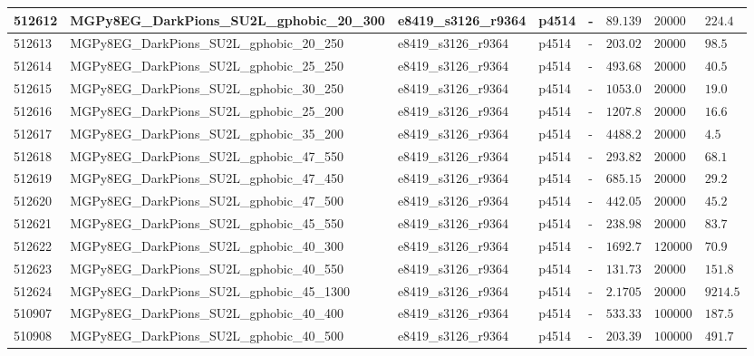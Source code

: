 \begin{table}[!hbtp]
{\begin{tabular}{llllllll}
    \hline
    512612 & MGPy8EG\_DarkPions\_SU2L\_gphobic\_20\_300 & e8419\_s3126\_r9364 & p4514 & - & $89.139$ & $20000$ & $224.4$\\
    \hline
    512613 & MGPy8EG\_DarkPions\_SU2L\_gphobic\_20\_250 & e8419\_s3126\_r9364 & p4514 & - & $203.02$ & $20000$ & $98.5$\\
    \hline
    512614 & MGPy8EG\_DarkPions\_SU2L\_gphobic\_25\_250 & e8419\_s3126\_r9364 & p4514 & - & $493.68$ & $20000$ & $40.5$\\
    \hline
    512615 & MGPy8EG\_DarkPions\_SU2L\_gphobic\_30\_250 & e8419\_s3126\_r9364 & p4514 & - & $1053.0$ & $20000$ & $19.0$\\
    \hline
    512616 & MGPy8EG\_DarkPions\_SU2L\_gphobic\_25\_200 & e8419\_s3126\_r9364 & p4514 & - & $1207.8$ & $20000$ & $16.6$\\
    \hline
    512617 & MGPy8EG\_DarkPions\_SU2L\_gphobic\_35\_200 & e8419\_s3126\_r9364 & p4514 & - & $4488.2$ & $20000$ & $4.5$\\
    \hline
    512618 & MGPy8EG\_DarkPions\_SU2L\_gphobic\_47\_550 & e8419\_s3126\_r9364 & p4514 & - & $293.82$ & $20000$ & $68.1$\\
    \hline
    512619 & MGPy8EG\_DarkPions\_SU2L\_gphobic\_47\_450 & e8419\_s3126\_r9364 & p4514 & - & $685.15$ & $20000$ & $29.2$\\
    \hline
    512620 & MGPy8EG\_DarkPions\_SU2L\_gphobic\_47\_500 & e8419\_s3126\_r9364 & p4514 & - & $442.05$ & $20000$ & $45.2$\\
    \hline
    512621 & MGPy8EG\_DarkPions\_SU2L\_gphobic\_45\_550 & e8419\_s3126\_r9364 & p4514 & - & $238.98$ & $20000$ & $83.7$\\
    \hline
    512622 & MGPy8EG\_DarkPions\_SU2L\_gphobic\_40\_300 & e8419\_s3126\_r9364 & p4514 & - & $1692.7$ & $120000$ & $70.9$\\
    \hline
    512623 & MGPy8EG\_DarkPions\_SU2L\_gphobic\_40\_550 & e8419\_s3126\_r9364 & p4514 & - & $131.73$ & $20000$ & $151.8$\\
    \hline
    512624 & MGPy8EG\_DarkPions\_SU2L\_gphobic\_45\_1300 & e8419\_s3126\_r9364 & p4514 & - & $2.1705$ & $20000$ & $9214.5$\\
    \hline
    510907 & MGPy8EG\_DarkPions\_SU2L\_gphobic\_40\_400 & e8419\_s3126\_r9364 & p4514 & - & $533.33$ & $100000$ & $187.5$\\
    \hline
    510908 & MGPy8EG\_DarkPions\_SU2L\_gphobic\_40\_500 & e8419\_s3126\_r9364 & p4514 & - & $203.39$ & $100000$ & $491.7$\\

\end{tabular}}
\end{table}
